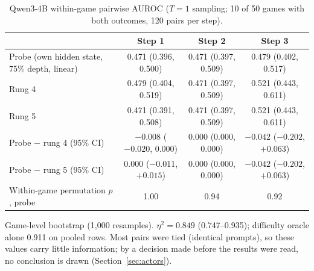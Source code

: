 \begin{table}[htbp]
\centering\small
\caption{Qwen3-4B within-game pairwise AUROC ($T = 1$ sampling; 10 of 50 games with both outcomes, 120 pairs per step).}\label{tab:a3}
\begin{tabularx}{\linewidth}{@{}Lccc@{}}
\toprule
 & Step 1 & Step 2 & Step 3 \\
\midrule
Probe (own hidden state, 75\% depth, linear) & 0.471 (0.396, 0.500) & 0.471 (0.397, 0.509) & 0.479 (0.402, 0.517) \\
Rung 4 & 0.479 (0.404, 0.519) & 0.471 (0.397, 0.509) & 0.521 (0.443, 0.611) \\
Rung 5 & 0.471 (0.391, 0.508) & 0.471 (0.397, 0.509) & 0.521 (0.443, 0.611) \\
Probe $-$ rung 4 (95\% CI) & $-0.008$ ($-0.020$, 0.000) & 0.000 (0.000, 0.000) & $-0.042$ ($-0.202$, $+0.063$) \\
Probe $-$ rung 5 (95\% CI) & 0.000 ($-0.011$, $+0.015$) & 0.000 (0.000, 0.000) & $-0.042$ ($-0.202$, $+0.063$) \\
Within-game permutation $p$, probe & 1.00 & 0.94 & 0.92 \\
\bottomrule
\end{tabularx}
\par\smallskip\raggedright\footnotesize
Game-level bootstrap (1,000 resamples). $\eta^2 = 0.849$ (0.747--0.935); difficulty oracle alone 0.911 on pooled rows. Most pairs were tied (identical prompts), so these values carry little information; by a decision made before the results were read, no conclusion is drawn (Section~\ref{sec:actors}).
\end{table}
